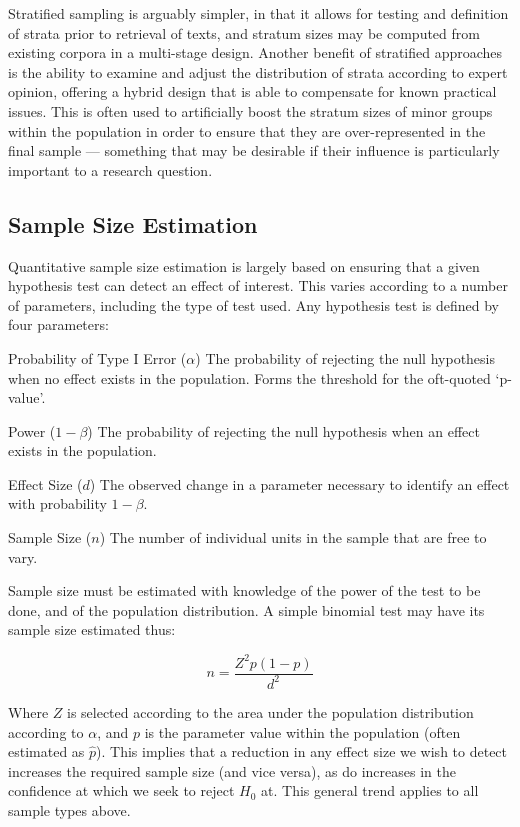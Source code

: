 Stratified sampling is arguably simpler, in that it allows for testing and definition of strata prior to retrieval of texts, and stratum sizes may be computed from existing corpora in a multi-stage design.  Another benefit of stratified approaches is the ability to examine and adjust the distribution of strata according to expert opinion, offering a hybrid design that is able to compensate for known practical issues.  This is often used to artificially boost the stratum sizes of minor groups within the population in order to ensure that they are over-represented in the final sample --- something that may be desirable if their influence is particularly important to a research question.



\subsection{Sample Size Estimation}
Quantitative sample size estimation is largely based on ensuring that a given hypothesis test can detect an effect of interest.  This varies according to a number of parameters, including the type of test used.  Any hypothesis test is defined by four parameters\cite{ellis2010essential}:

\begin{itemizeTitle}
    \item[Probability of Type I Error ($\alpha$)] The probability of rejecting the null hypothesis when no effect exists in the population.  Forms the threshold for the oft-quoted `p-value'.
    \item[Power ($1 - \beta$)] The probability of rejecting the null hypothesis when an effect exists in the population.
    \item[Effect Size ($d$)] The observed change in a parameter necessary to identify an effect with probability $1 - \beta$.
    \item[Sample Size ($n$)] The number of individual units in the sample that are free to vary.
\end{itemizeTitle}

Sample size must be estimated with knowledge of the power of the test to be done, and of the population distribution.  A simple binomial test may have its sample size estimated thus:

$$
n = \frac{Z^2p(1-p)}{d^2}
$$

Where $Z$ is selected according to the area under the population distribution according to $\alpha$, and $p$ is the parameter value within the population (often estimated as $\hat{p}$).  This implies that a reduction in any effect size we wish to detect increases the required sample size (and vice versa), as do increases in the confidence at which we seek to reject $H_0$ at.  This general trend applies to all sample types above.

